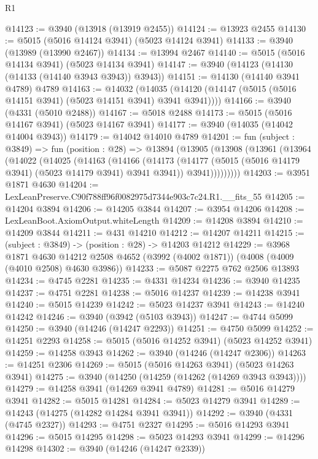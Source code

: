 \begin{lexlean}{R1}
\begin{coremodule}
@14123 := @3940 (@13918 (@13919 @2455))
@14124 := @13923 @2455
@14130 := @5015 (@5016 @14124 @3941) (@5023 @14124 @3941)
@14133 := @3940 (@13989 (@13990 @2467))
@14134 := @13994 @2467
@14140 := @5015 (@5016 @14134 @3941) (@5023 @14134 @3941)
@14147 := @3940 (@14123 (@14130 (@14133 (@14140 @3943 @3943)) @3943))
@14151 := @14130 (@14140 @3941 @4789) @4789
@14163 := @14032
    (@14035 (@14120 (@14147 (@5015 (@5016 @14151 @3941) (@5023 @14151 @3941) @3941 @3941))))
@14166 := @3940 (@4331 (@5010 @2488))
@14167 := @5018 @2488
@14173 := @5015 (@5016 @14167 @3941) (@5023 @14167 @3941)
@14177 := @3940 (@14035 (@14042 @14004 @3943))
@14179 := @14042 @14010 @4789
@14201 := fun (subject : @3849) =>
  fun (position : @28) =>
  @13894
    (@13905
      (@13908
        (@13961
          (@13964
            (@14022
              (@14025
                (@14163
                  (@14166
                    (@14173
                      (@14177 (@5015 (@5016 @14179 @3941) (@5023 @14179 @3941) @3941 @3941))
                      @3941)))))))))
@14203 := @3951 @1871 @4630
@14204 := LexLeanPreserve.C90f788ff96f0082975d7344e903c7c24.R1.__fits_55
@14205 := @14204 @3894
@14206 := @14205 @3844
@14207 := @3954 @14206
@14208 := LexLeanBoot.AxiomOutput.whiteLength
@14209 := @14208 @3894
@14210 := @14209 @3844
@14211 := @431 @14210
@14212 := @14207 @14211
@14215 := (subject : @3849) -> (position : @28) -> @14203 @14212
@14229 := @3968
    @1871
    @4630
    @14212
    @2508
    @4652
    (@3992 (@4002 @1871))
    (@4008 (@4009 (@4010 @2508) @4630 @3986))
@14233 := @5087 @2275 @762 @2506 @13893
@14234 := @4745 @2281
@14235 := @4331 @14234
@14236 := @3940 @14235
@14237 := @4751 @2281
@14238 := @5016 @14237
@14239 := @14238 @3941
@14240 := @5015 @14239
@14242 := @5023 @14237 @3941
@14243 := @14240 @14242
@14246 := @3940 (@3942 (@5103 @3943))
@14247 := @4744 @5099
@14250 := @3940 (@14246 (@14247 @2293))
@14251 := @4750 @5099
@14252 := @14251 @2293
@14258 := @5015 (@5016 @14252 @3941) (@5023 @14252 @3941)
@14259 := @14258 @3943
@14262 := @3940 (@14246 (@14247 @2306))
@14263 := @14251 @2306
@14269 := @5015 (@5016 @14263 @3941) (@5023 @14263 @3941)
@14275 := @3940 (@14250 (@14259 (@14262 (@14269 @3943 @3943))))
@14279 := @14258 @3941 (@14269 @3941 @4789)
@14281 := @5016 @14279 @3941
@14282 := @5015 @14281
@14284 := @5023 @14279 @3941
@14289 := @14243 (@14275 (@14282 @14284 @3941 @3941))
@14292 := @3940 (@4331 (@4745 @2327))
@14293 := @4751 @2327
@14295 := @5016 @14293 @3941
@14296 := @5015 @14295
@14298 := @5023 @14293 @3941
@14299 := @14296 @14298
@14302 := @3940 (@14246 (@14247 @2339))

\end{coremodule}
\end{lexlean}
